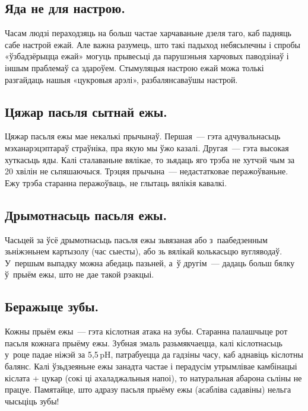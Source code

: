 
\subsection{Яда не для настрою.}
Часам людзі пераходзяць на больш частае харчаваньне дзеля таго, каб падняць сабе настрой ежай. Але важна разумець, што такі падыход небясьпечны і спробы «ўзбадзёрыцца ежай» могуць прывесьці да парушэньня харчовых паводзінаў і іншым праблемаў са здароўем. Стымуляцыя настрою ежай можа толькі разгайдаць нашыя «цукровыя арэлі», разбалянсаваўшы настрой.

\subsection{Цяжар пасьля сытнай ежы.}
Цяжар пасьля ежы мае некалькі прычынаў. Першая~--- гэта адчувальнасьць мэханарэцэптараў страўніка, пра якую мы ўжо казалі. Другая~--- гэта высокая хуткасьць яды. Калі сталаваньне вялікае, то зьядаць яго трэба не хутчэй чым за 20 хвілін не сьпяшаючыся. Трэцяя прычына~--- недастатковае перажоўваньне. Ежу трэба старанна перажоўваць, не глытаць вялікія кавалкі.

\subsection{Дрымотнасьць пасьля ежы.}
Часьцей за ўсё дрымотнасьць пасьля ежы зьвязаная або з~паабедзенным зьніжэньнем картызолу (час сыесты), або зь вялікай колькасьцю вугляводаў. У~першым выпадку можна абедаць пазьней, а~ў другім~--- дадаць больш бялку ў~прыём ежы, што не дае такой рэакцыі.

\subsection{Беражыце зубы.}
Кожны прыём ежы~--- гэта кіслотная атака на зубы. Старанна палашчыце рот пасьля кожнага прыёму ежы. Зубная эмаль разьмякчаецца, калі кіслотнасьць у~роце падае ніжэй за 5{,}5\,pH, патрабуецца да гадзіны часу, каб аднавіць кіслотны балянс. Калі ўзьдзеяньне ежы занадта частае і перадусім утрымлівае камбінацыі кіслата + цукар (сокі ці ахаладжальныя напоі), то натуральная абарона сьліны не працуе. Памятайце, што адразу пасьля прыёму ежы (асабліва садавіны) нельга чысьціць зубы!


